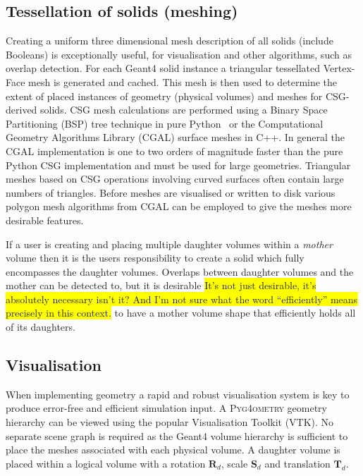 \documentclass[final,5p,times,twocolumn]{elsarticle}
\newcommand{\PYGEOMETRY}{\textsc{Pyg4ometry}}
\begin{document}
\subsection{Tessellation of solids (meshing)}
Creating a uniform three dimensional mesh description of all solids (include Booleans) is exceptionally useful, for visualisation and other algorithms, such as overlap 
detection. For each Geant4 solid instance a triangular tessellated Vertex-Face mesh is generated and cached. This mesh is then used to determine the extent 
of placed instances of geometry (physical volumes) and meshes for CSG-derived solids. CSG mesh calculations are performed using a Binary Space Partitioning (BSP) tree technique in pure Python~\cite{pycsg} or the Computational Geometry Algorithms Library (CGAL) surface meshes \cite{cgal:bsmf-sm-20b} in C++. In general the CGAL implementation is one to two orders of magnitude faster than the pure Python CSG implementation and must be used for large geometries. Triangular meshes based on CSG operations involving curved surfaces often contain large numbers of triangles. Before meshes are visualised or written to disk various polygon mesh algorithms  from CGAL \cite{cgal:lty-pmp-20b} can be employed to give the meshes more desirable features. 

If a user is creating and placing multiple daughter volumes within a {\em mother} volume then it is the users responsibility to create a solid which fully 
encompasses the daughter volumes. Overlaps between daughter volumes and the mother can be detected to, but it is desirable \colorbox{yellow}{It's not just desirable, it's absolutely necessary isn't it?  And I'm not sure what the word ``efficiently'' means precisely in this context.} to have a mother volume 
shape that efficiently holds all of its daughters. 
 
\subsection{Visualisation} \label{sec:visualisation}
When implementing geometry a rapid and robust visualisation system is key to produce error-free and efficient simulation input.
A  \PYGEOMETRY{} geometry hierarchy can be viewed using the popular Visualisation Toolkit (VTK). No separate scene graph is required as the Geant4 volume hierarchy is sufficient 
to place the meshes associated with each physical volume. A daughter volume is placed within a logical volume with a rotation $\mathbf{R}_d$, scale $\mathbf{S}_d$ and translation $\mathbf{T}_d$.
\end{document}
